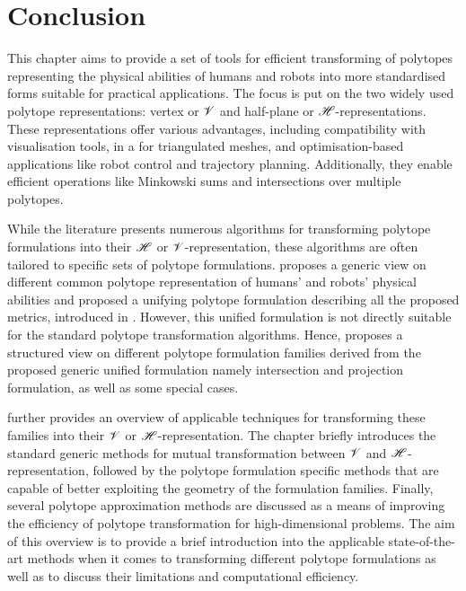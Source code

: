\section{Conclusion}

This chapter aims to provide a set of tools for efficient transforming of polytopes representing the physical abilities of humans and robots into more standardised forms suitable for practical applications. The focus is put on the two widely used polytope representations: vertex or $\mathscr{V}$ and half-plane or $\mathscr{H}$-representations. These representations offer various advantages, including compatibility with visualisation tools, in a for triangulated meshes, and optimisation-based applications like robot control and trajectory planning. Additionally, they enable efficient operations like Minkowski sums and intersections over multiple polytopes.

While the literature presents numerous algorithms for transforming polytope formulations into their $\mathscr{H}$ or $\mathscr{V}$-representation, these algorithms are often tailored to specific sets of polytope formulations.  proposes a generic view on different common polytope representation of humans' and robots' physical abilities and proposed a unifying polytope formulation describing all the proposed metrics, introduced in . However, this unified formulation is not directly suitable for the standard polytope transformation algorithms. Hence,  proposes a structured view on different polytope formulation families derived from the proposed generic unified formulation namely intersection and projection formulation, as well as some special cases.

 further provides an overview of applicable techniques for transforming these families into their $\mathscr{V}$ or $\mathscr{H}$-representation. The chapter briefly introduces the standard generic methods for mutual transformation between $\mathscr{V}$ and $\mathscr{H}$-representation, followed by the polytope formulation specific methods that are capable of better exploiting the geometry of the formulation families. Finally, several polytope approximation methods are discussed as a means of improving the efficiency of polytope transformation for high-dimensional problems. 
The aim of this overview is to provide a brief introduction into the applicable state-of-the-art methods when it comes to transforming different polytope formulations as well as to discuss their limitations and computational efficiency.

